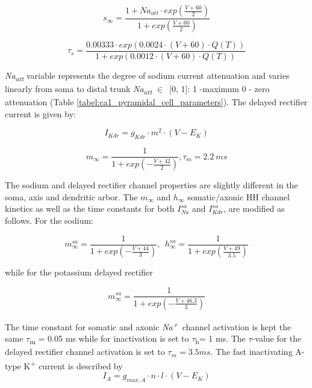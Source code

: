 \documentclass[a4paper,12pt]{article}
\begin{document}
\begin{equation}
s_{\infty}=\frac{1+Na_{att}\cdot exp(\frac{V+60}{2})}{1+exp(\frac{V+60}{2})}
\end{equation}


\begin{equation}
\tau_s=\frac{0.00333\cdot  exp(0.0024 \cdot (V+60)\cdot
		Q(T))}{1+exp(0.0012 \cdot (V+60)\cdot Q(T))}
\end{equation}

\textit{Na\textsubscript{att}} variable represents the degree of sodium current
attenuation and varies linearly from soma to distal trunk
\textit{Na\textsubscript{att}} $\in$~[0, 1]: 1 -maximum 0 - zero attenuation (Table \ref{tabel:ca1_pyramidal_cell_parameters}). The delayed rectifier current is given by:

\begin{equation}
I_{Kdr} = g_{Kdr} \cdot m^2 \cdot (V-E_K)
\end{equation}

\begin{equation}
m_{\infty}=\frac{1}{1+exp(-\frac{V+42}{2})}, \tau_m = 2.2 \ ms
\end{equation}

The sodium and delayed rectifier channel properties are slightly different in the soma, axis and dendritic arbor. The $m_{\infty}$ and $h_{\infty}$
somatic/axonic HH channel kinetics as well as the time constants for both $I_{Na}^{sa}$ and $I_{Kdr}^{sa}$, are modified as follows. For the sodium:

\begin{equation}
m_{\infty}^{sa}=\frac {1}{1+exp(-\frac{V+44}{3})} ,\ \ 
h_{\infty}^{sa}=\frac {1}{1+exp(\frac{V+49}{3.5})}
\end{equation}

while for the potassium delayed rectifier

\begin{equation}
m_{\infty}^{sa}=\frac {1}{1+exp(-\frac{V+46.3}{3})}
\end{equation}

The time constant for somatic and axonic \textit{Na\textsuperscript{+}}~channel activation is kept the
same $\tau$\textsubscript{m} = 0.05 ms while for inactivation is set to $\tau$\textsubscript{h}= 1 ms. The $\tau$-value for the delayed rectifier channel activation is set to $\tau_{m}= 3.5 ms$.
The fast inactivating A-type K\textsuperscript{+} current is described by
\begin{equation}
I_A = g_{max, A} \cdot n \cdot l \cdot (V - E_K)
\end{equation}
\end{document}
